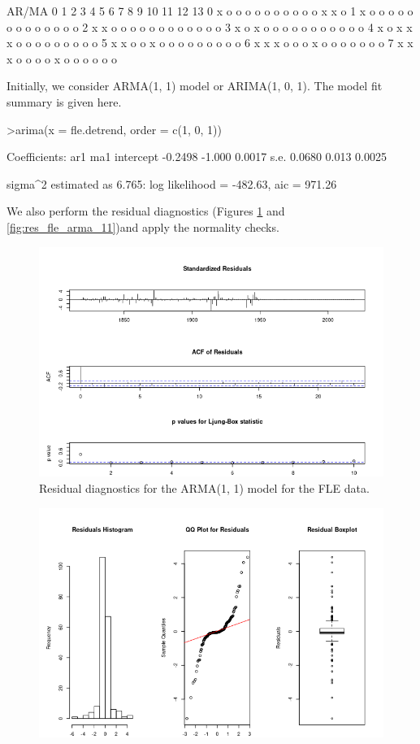 \begin{enumerate}[label=(\alph*)]
\begin{block}
AR/MA
  0 1 2 3 4 5 6 7 8 9 10 11 12 13
0 x o o o o o o o o o o  x  x  o 
1 x o o o o o o o o o o  o  o  o 
2 x x o o o o o o o o o  o  o  o 
3 x o x o o o o o o o o  o  o  o 
4 x o x x x o o o o o o  o  o  o 
5 x x o o x o o o o o o  o  o  o 
6 x x x o o o x o o o o  o  o  o 
7 x x x o o o o x o o o  o  o  o
\end{block}
\normalsize Initially, we consider ARMA(1, 1) model or ARIMA(1, 0, 1). The model fit summary is given here.
\small\begin{block}
>arima(x = fle.detrend, order = c(1, 0, 1))

Coefficients:
          ar1     ma1  intercept
      -0.2498  -1.000     0.0017
s.e.   0.0680   0.013     0.0025

sigma^2 estimated as 6.765:  log likelihood = -482.63,  aic = 971.26
\end{block}
\normalsize We also perform the residual diagnostics (Figures \ref{fig:tsdiag_fle_arma_11} and \ref{fig:res_fle_arma_11})and apply the normality checks.
\begin{figure}[!htb]
    \centering
    \includegraphics[width=\linewidth]{Images/P4/TSDiag_ARMA_11.png}
    \caption[Residual diagnostics for the ARMA(1, 1) model for the FLE data.]{Residual diagnostics for the ARMA(1, 1) model for the FLE data.}
    \label{fig:tsdiag_fle_arma_11}
\end{figure}
\begin{figure}[!htb]
    \centering
    \includegraphics[width=\linewidth]{Images/P4/Residuals_FLE_ARMA_11.png}

\end{figure}
\end{enumerate}
